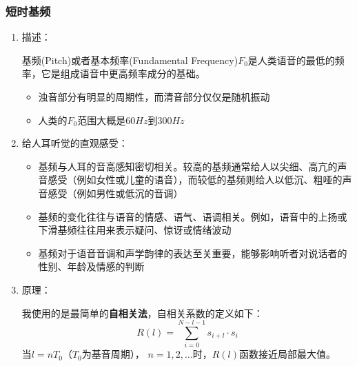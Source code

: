 \documentclass[a4paper]{article}
\begin{document}
\subsubsection{短时基频}
\begin{enumerate}
  \item 
  {
    描述：

    基频(Pitch)或者基本频率(Fundamental Frequency)$F_0$是人类语音的最低的频率，它是组成语音中更高频率成分的基础。
    \begin{itemize}
      \item 浊音部分有明显的周期性，而清音部分仅仅是随机振动
      \item 人类的$F_0$范围大概是$60Hz$到$300Hz$
    \end{itemize}
  }
  \item 
  {
    给人耳听觉的直观感受：
    \begin{itemize}
      \item 基频与人耳的音高感知密切相关。较高的基频通常给人以尖细、高亢的声音感受（例如女性或儿童的语音），而较低的基频则给人以低沉、粗哑的声音感受（例如男性或低沉的音调）

      \item 基频的变化往往与语音的情感、语气、语调相关。例如，语音中的上扬或下滑基频往往用来表示疑问、惊讶或情绪波动
      
      \item 基频对于语音音调和声学韵律的表达至关重要，能够影响听者对说话者的性别、年龄及情感的判断
    \end{itemize}
  }
  \item 
  {
    原理：

    我使用的是最简单的\textbf{自相关法}，自相关系数的定义如下：
    \begin{equation}
      R(l) = \sum_{i=0}^{N-l-1}s_{i+l}\cdot s_{i}
    \end{equation}
    当$l=nT_0$（$T_0$为基音周期）， $n = 1, 2, \dots$时，$R(l)$函数接近局部最大值。

}
\end{enumerate}
\end{document}

